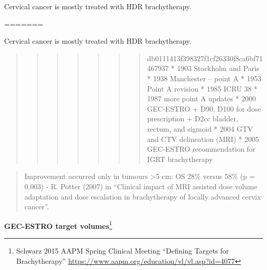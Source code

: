 \documentclass[]{book}
\let\rmarkdownfootnote\footnote%
\def\footnote{\protect\rmarkdownfootnote}
\theoremstyle{definition}
\theoremstyle{definition}
\theoremstyle{definition}
\theoremstyle{remark}
\begin{document}
Cervical cancer is mostly treated with HDR brachytherapy.

=======

Cervical cancer is mostly treated with HDR brachytherapy.

\begin{quote}
\begin{quote}
\begin{quote}
\begin{quote}
\begin{quote}
\begin{quote}
\begin{quote}
db0111413f398327f1cf26330f8ca6bf71467937 * 1903 Stockholm and Paris *
1938 Manchester -- point A * 1953 Point A revision * 1985 ICRU 38 * 1987
more point A updates * 2000 GEC-ESTRO + D90, D100 for dose prescription
+ D2cc bladder, rectum, and sigmoid * 2004 GTV and CTV delineation (MRI)
* 2005 GEC-ESTRO recommendation for IGRT brachytherapy
\end{quote}
\end{quote}
\end{quote}
\end{quote}
\end{quote}
\end{quote}
\end{quote}

\begin{quote}
Improvement occurred only in tumours \textgreater{}5 cm: OS 28\% versus
58\% (p = 0.003) - R. Potter (2007) in ``Clinical impact of MRI assisted
dose volume adaptation and dose escalation in brachytherapy of locally
advanced cervix cancer''.
\end{quote}

\textbf{GEC-ESTRO target volumes}\footnote{Schwarz 2015 AAPM Spring
  Clinical Meeting ``Defining Targets for Brachytherapy''
  \url{https://www.aapm.org/education/vl/vl.asp?id=4077}}
\end{document}
